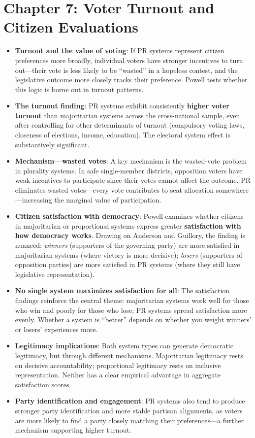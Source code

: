 \documentclass[12pt]{article}
\begin{document}
\section{Chapter 7: Voter Turnout and Citizen Evaluations}

\begin{itemize}[leftmargin=*, itemsep=4pt]
    \item \textbf{Turnout and the value of voting}: If PR systems represent citizen preferences more broadly, individual voters have stronger incentives to turn out---their vote is less likely to be ``wasted'' in a hopeless contest, and the legislative outcome more closely tracks their preference. Powell tests whether this logic is borne out in turnout patterns.
    \item \textbf{The turnout finding}: PR systems exhibit consistently \textbf{higher voter turnout} than majoritarian systems across the cross-national sample, even after controlling for other determinants of turnout (compulsory voting laws, closeness of elections, income, education). The electoral system effect is substantively significant.
    \item \textbf{Mechanism---wasted votes}: A key mechanism is the wasted-vote problem in plurality systems. In safe single-member districts, opposition voters have weak incentives to participate since their votes cannot affect the outcome. PR eliminates wasted votes---every vote contributes to seat allocation somewhere---increasing the marginal value of participation.
    \item \textbf{Citizen satisfaction with democracy}: Powell examines whether citizens in majoritarian or proportional systems express greater \textbf{satisfaction with how democracy works}. Drawing on Anderson and Guillory, the finding is nuanced: \emph{winners} (supporters of the governing party) are more satisfied in majoritarian systems (where victory is more decisive); \emph{losers} (supporters of opposition parties) are more satisfied in PR systems (where they still have legislative representation).
    \item \textbf{No single system maximizes satisfaction for all}: The satisfaction findings reinforce the central theme: majoritarian systems work well for those who win and poorly for those who lose; PR systems spread satisfaction more evenly. Whether a system is ``better'' depends on whether you weight winners' or losers' experiences more.
    \item \textbf{Legitimacy implications}: Both system types can generate democratic legitimacy, but through different mechanisms. Majoritarian legitimacy rests on decisive accountability; proportional legitimacy rests on inclusive representation. Neither has a clear empirical advantage in aggregate satisfaction scores.
    \item \textbf{Party identification and engagement}: PR systems also tend to produce stronger party identification and more stable partisan alignments, as voters are more likely to find a party closely matching their preferences---a further mechanism supporting higher turnout.
\end{itemize}
\end{document}

